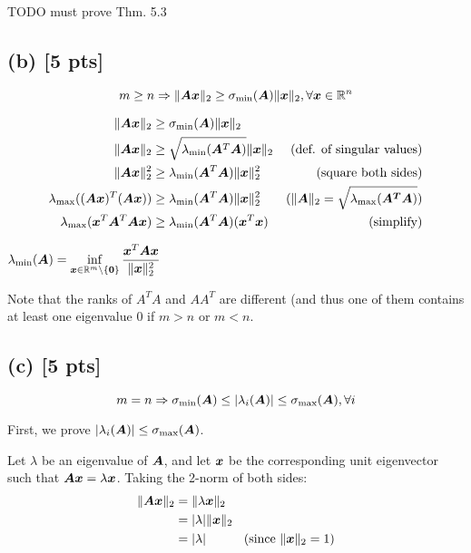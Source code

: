 \documentclass[twoside,10pt]{article}
\begin{document}
TODO must prove Thm. 5.3

\subsection*{(b) [5 pts]}
  \begin{equation*}
    m \geq n \Rightarrow \|\mtx{A}\vct{x}\|_2 \geq \sigma_{\mathrm{min}}\left(\mtx{A}\right) \|\vct{x}\|_2, \forall \vct{x} \in \R^n
  \end{equation*}

\begin{align*}
  \|\mtx{A}\vct{x}\|_2 &\geq \sigma_{\mathrm{min}}\left(\mtx{A}\right) \|\vct{x}\|_2\\
  \|\mtx{A}\vct{x}\|_2 &\geq \sqrt{\lambda_{\mathrm{min}}(\mtx{A}^T\mtx{A})} \|\vct{x}\|_2 &\text{(def. of singular values)}\\
  \|\mtx{A}\vct{x}\|_2^2 &\geq \lambda_{\mathrm{min}}(\mtx{A}^T\mtx{A}) \|\vct{x}\|_2^2 &\text{(square both sides)}\\
  \lambda_{\mathrm{max}}((\mtx{A}\vct{x})^T(\mtx{A}\vct{x})) &\geq \lambda_{\mathrm{min}}(\mtx{A}^T\mtx{A}) \|\vct{x}\|_2^2 &\text{($\|\mtx{A}\|_2 = \sqrt{\lambda_{\mathrm{max}}(\mtx{A^T}\mtx{A})}$)}\\
  \lambda_{\mathrm{max}}(\vct{x}^T\mtx{A}^T\mtx{A}\vct{x}) &\geq \lambda_{\mathrm{min}}(\mtx{A}^T\mtx{A}) (\vct{x}^T\vct{x})  &\text{(simplify)}
\end{align*}

   $\lambda_{\mathrm{min}}\left(\mtx{A}\right) = \inf \limits_{\vct{x} \in \R^m \setminus \{\vct{0}\}} \dfrac{\vct{x}^T \mtx{A}\vct{x}}{\|\vct{x}\|_2^2}$

  Note that the ranks of $A^TA$ and $AA^T$ are different (and thus one of them contains at least one eigenvalue $0$ if $m > n$ or $m < n$.

\subsection*{(c) [5 pts]}
  \begin{equation*}
    m = n \Rightarrow \sigma_{\mathrm{min}}(\mtx{A}) \leq \left|\lambda_{i}\left(\mtx{A}\right)\right| \leq \sigma_{\mathrm{max}}\left(\mtx{A}\right), \forall i 
  \end{equation*}

  First, we prove $\left|\lambda_{i}(\mtx{A})\right| \leq \sigma_{\mathrm{max}}\left(\mtx{A}\right)$.

  Let $\lambda$ be an eigenvalue of $\bm{A}$, and let $\bm{x}$ be the corresponding unit eigenvector such that $\bm{A}\bm{x} = \lambda\bm{x}$. 
  Taking the 2-norm of both sides:
  \begin{align*}
    \|\bm{A}\bm{x}\|_2 &= \|\lambda \bm{x}\|_2\\
    &= |\lambda| \|\bm{x}\|_2\\
    &= |\lambda|\quad\quad\quad\text{(since $\|\bm{x}\|_2 = 1$)}
  \end{align*}
  
\end{document}
